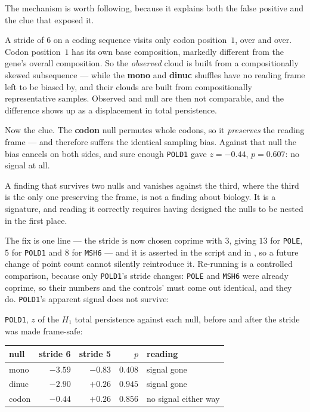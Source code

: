 \begin{remark}
The mechanism is worth following, because it explains both the false positive and
the clue that exposed it.

A stride of $6$ on a coding sequence visits only codon position~$1$, over and
over. Codon position~$1$ has its own base composition, markedly different from
the gene's overall composition. So the \emph{observed} cloud is built from a
compositionally skewed subsequence --- while the \textbf{mono} and \textbf{dinuc}
shuffles have no reading frame left to be biased by, and their clouds are built
from compositionally representative samples. Observed and null are then not
comparable, and the difference shows up as a displacement in total persistence.

Now the clue. The \textbf{codon} null permutes whole codons, so it
\emph{preserves} the reading frame --- and therefore suffers the identical
sampling bias. Against that null the bias cancels on both sides, and sure enough
\texttt{POLD1} gave $z = -0.44$, $p = 0.607$: no signal at all.

A finding that survives two nulls and vanishes against the third, where the
third is the only one preserving the frame, is not a finding about biology. It is
a signature, and reading it correctly requires having designed the nulls to be
nested in the first place.
\end{remark}

The fix is one line --- the stride is now chosen coprime with $3$, giving $13$
for \texttt{POLE}, $5$ for \texttt{POLD1} and $8$ for \texttt{MSH6} --- and it is
asserted in the script and in , so a
future change of point count cannot silently reintroduce it. Re-running is a
controlled comparison, because only \texttt{POLD1}'s stride changes: \texttt{POLE}
and \texttt{MSH6} were already coprime, so their numbers and the controls' must
come out identical, and they do. \texttt{POLD1}'s apparent signal does not
survive:

\medskip
\noindent
\texttt{POLD1}, $z$ of the $H_1$ total persistence against each null, before and
after the stride was made frame-safe:

\medskip
\begin{tabular}{@{}l r r r l@{}}
\toprule
\textbf{null} & \textbf{stride 6} & \textbf{stride 5} & \textbf{$p$} & \textbf{reading} \\
\midrule
mono  & $-3.59$ & $-0.83$ & $0.408$ & signal gone \\
dinuc & $-2.90$ & $+0.26$ & $0.945$ & signal gone \\
codon & $-0.44$ & $+0.26$ & $0.856$ & no signal either way \\
\bottomrule
\end{tabular}

